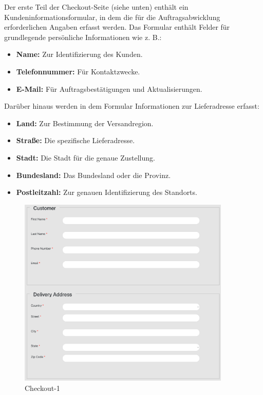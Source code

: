 Der erste Teil der Checkout-Seite (siehe unten) enthält ein Kundeninformationsformular, in dem die für die Auftragsabwicklung erforderlichen Angaben erfasst werden. Das Formular enthält Felder für grundlegende persönliche Informationen wie z. B.:

\begin{itemize}
	\item \textbf{Name:} Zur Identifizierung des Kunden.
	\item \textbf{Telefonnummer:} Für Kontaktzwecke.
	\item \textbf{E-Mail:} Für Auftragsbestätigungen und Aktualisierungen.
\end{itemize}

Darüber hinaus werden in dem Formular Informationen zur Lieferadresse erfasst:

\begin{itemize}
	\item \textbf{Land:} Zur Bestimmung der Versandregion.
	\item \textbf{Straße:} Die spezifische Lieferadresse.
	\item \textbf{Stadt:} Die Stadt für die genaue Zustellung.
	\item \textbf{Bundesland:} Das Bundesland oder die Provinz.
	\item \textbf{Postleitzahl:} Zur genauen Identifizierung des Standorts.
\end{itemize}

\begin{figure}[H]  
	\centering %
	\includegraphics[width=0.9\textwidth]{Images/Checkout_1.png} 
	\caption{Checkout-1} 
	\label{fig:sample3-image} 
\end{figure}


















